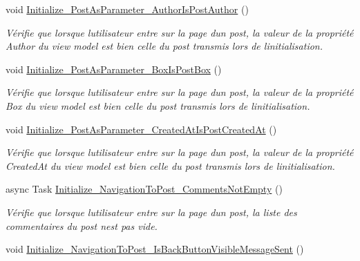 \begin{DoxyCompactItemize}
void \hyperlink{class_boxes_1_1_tests_1_1_post_view_model_tests_a6868bce9123c3ef769388f8d40ef382f}{Initialize\+\_\+\+Post\+As\+Parameter\+\_\+\+Author\+Is\+Post\+Author} ()
\begin{DoxyCompactList}\small\item\em Vérifie que lorsque l\textquotesingle{}utilisateur entre sur la page d\textquotesingle{}un post, la valeur de la propriété {\ttfamily Author} du view model est bien celle du post transmis lors de l\textquotesingle{}initialisation. \end{DoxyCompactList}\item 
void \hyperlink{class_boxes_1_1_tests_1_1_post_view_model_tests_a0d6a35ea7504c75731ee7f601d14f7b4}{Initialize\+\_\+\+Post\+As\+Parameter\+\_\+\+Box\+Is\+Post\+Box} ()
\begin{DoxyCompactList}\small\item\em Vérifie que lorsque l\textquotesingle{}utilisateur entre sur la page d\textquotesingle{}un post, la valeur de la propriété {\ttfamily Box} du view model est bien celle du post transmis lors de l\textquotesingle{}initialisation. \end{DoxyCompactList}\item 
void \hyperlink{class_boxes_1_1_tests_1_1_post_view_model_tests_ab61369b6959480ecb3b1235da5c14bf2}{Initialize\+\_\+\+Post\+As\+Parameter\+\_\+\+Created\+At\+Is\+Post\+Created\+At} ()
\begin{DoxyCompactList}\small\item\em Vérifie que lorsque l\textquotesingle{}utilisateur entre sur la page d\textquotesingle{}un post, la valeur de la propriété {\ttfamily Created\+At} du view model est bien celle du post transmis lors de l\textquotesingle{}initialisation. \end{DoxyCompactList}\item 
async Task \hyperlink{class_boxes_1_1_tests_1_1_post_view_model_tests_aad2c0e3f63a3b38e1efcb2adfef57dbe}{Initialize\+\_\+\+Navigation\+To\+Post\+\_\+\+Comments\+Not\+Empty} ()
\begin{DoxyCompactList}\small\item\em Vérifie que lorsque l\textquotesingle{}utilisateur entre sur la page d\textquotesingle{}un post, la liste des commentaires du post n\textquotesingle{}est pas vide. \end{DoxyCompactList}\item 
void \hyperlink{class_boxes_1_1_tests_1_1_post_view_model_tests_a6af297e2d2595caa12939d9283615c6d}{Initialize\+\_\+\+Navigation\+To\+Post\+\_\+\+Is\+Back\+Button\+Visible\+Message\+Sent} ()

\end{DoxyCompactItemize}
